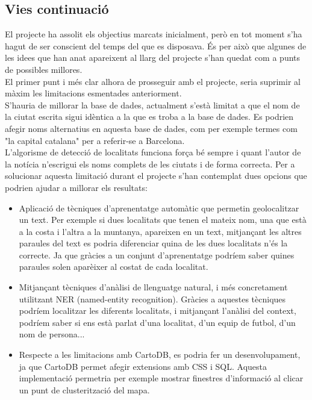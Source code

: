 \documentclass[12pt,a4paper,openright,oneside]{article}
\numberwithin{equation}{section}
\theoremstyle{definition}
\begin{document}
\subsection{Vies continuació}
El projecte ha assolit els objectius marcats inicialment, però en tot moment s'ha hagut de ser conscient del temps del que es disposava. És per això que algunes de les idees que han anat apareixent al llarg del projecte s'han quedat com a punts de possibles millores.\\
El primer punt i més clar alhora de prosseguir amb el projecte, seria suprimir al màxim les limitacions esmentades anteriorment.\\
S'hauria de millorar la base de dades, actualment s'està limitat a que el nom de la ciutat escrita sigui idèntica a la que es troba a la base de dades. Es podrien afegir noms alternatius en aquesta base de dades, com per exemple termes com "la capital catalana" per a referir-se a Barcelona. \\
L'algorisme de detecció de localitats funciona força bé sempre i quant l'autor de la notícia n'escrigui els noms complets de les ciutats i de forma correcta. Per a solucionar aquesta limitació durant el projecte s'han contemplat dues opcions que podrien ajudar a millorar els resultats:
\begin{itemize}
\item Aplicació de tècniques d'aprenentatge automàtic que permetin geolocalitzar un text. Per exemple si dues localitats que tenen el mateix nom, una que està a la costa i l'altra a la muntanya, apareixen en un text, mitjançant les altres paraules del text es podria diferenciar quina de les dues localitats n'és la correcte. Ja que gràcies a un conjunt d'aprenentatge podríem saber quines paraules solen aparèixer al costat de cada localitat.
\item Mitjançant tècniques d'anàlisi de llenguatge natural, i més concretament utilitzant NER (named-entity recognition). Gràcies a aquestes tècniques podríem localitzar les diferents localitats, i mitjançant l'anàlisi del context, podríem saber si ens està parlat d'una localitat, d'un equip de futbol, d'un nom de persona...
\item Respecte a les limitacions amb CartoDB, es podria fer un desenvolupament, ja que CartoDB permet afegir extensions amb CSS i SQL. Aquesta implementació permetria per exemple mostrar finestres d'informació al clicar un punt de clusterització del mapa.
\end{itemize}
\end{document}
